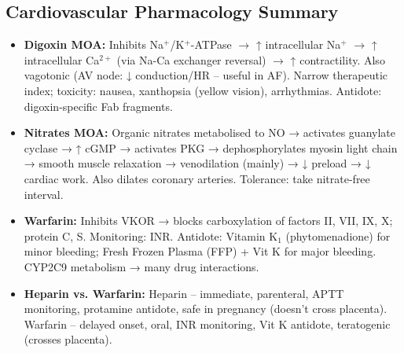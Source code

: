 \documentclass[11pt,a4paper]{article}
\begin{document}
\subsection{Cardiovascular Pharmacology Summary}
\begin{itemize}[leftmargin=*]
    \item \textbf{Digoxin MOA:} Inhibits Na$^+$/K$^+$-ATPase $\rightarrow$ ↑ intracellular Na$^+$ $\rightarrow$ ↑ intracellular Ca$^{2+}$ (via Na-Ca exchanger reversal) $\rightarrow$ ↑ contractility. Also vagotonic (AV node: ↓ conduction/HR -- useful in AF). Narrow therapeutic index; toxicity: nausea, xanthopsia (yellow vision), arrhythmias. Antidote: digoxin-specific Fab fragments.
    \item \textbf{Nitrates MOA:} Organic nitrates metabolised to NO → activates guanylate cyclase → ↑ cGMP → activates PKG → dephosphorylates myosin light chain → smooth muscle relaxation → venodilation (mainly) → ↓ preload → ↓ cardiac work. Also dilates coronary arteries. Tolerance: take nitrate-free interval.
    \item \textbf{Warfarin:} Inhibits VKOR → blocks carboxylation of factors II, VII, IX, X; protein C, S. Monitoring: INR. Antidote: Vitamin K$_1$ (phytomenadione) for minor bleeding; Fresh Frozen Plasma (FFP) + Vit K for major bleeding. CYP2C9 metabolism → many drug interactions.
    \item \textbf{Heparin vs. Warfarin:} Heparin -- immediate, parenteral, APTT monitoring, protamine antidote, safe in pregnancy (doesn't cross placenta). Warfarin -- delayed onset, oral, INR monitoring, Vit K antidote, teratogenic (crosses placenta).
\end{itemize}
\end{document}
